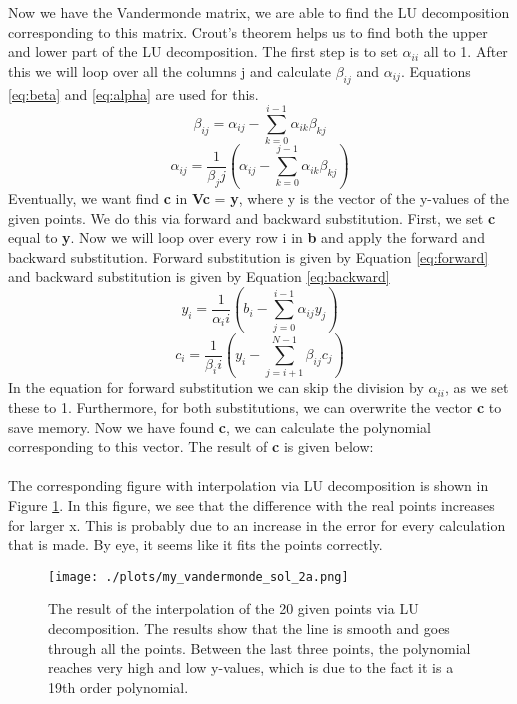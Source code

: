 Now we have the Vandermonde matrix, we are able to find the LU decomposition corresponding to this matrix. Crout's theorem helps us to find both the upper and lower part of the LU decomposition. The first step is to set $\alpha_{ii}$ all to 1. After this we will loop over all the columns j and calculate $\beta_{ij}$ and $\alpha_{ij}$. Equations \ref{eq:beta} and \ref{eq:alpha} are used for this.
\begin{equation}\label{eq:beta}
    \beta_{ij} = \alpha_{ij} - \sum^{i-1}_{k=0}{\alpha_{ik}\beta_{kj}}
\end{equation}
\begin{equation}\label{eq:alpha}
    \alpha_{ij} = \frac{1}{\beta_jj} \left(\alpha_{ij} - \sum^{j-1}_{k=0}{\alpha_{ik}\beta_{kj}}\right)
\end{equation}
Eventually, we want find \textbf{c} in \textbf{Vc} = \textbf{y}, where y is the vector of the y-values of the given points. We do this via forward and backward substitution. First, we set \textbf{c} equal to \textbf{y}. Now we will loop over every row i in \textbf{b} and apply the forward and backward substitution. Forward substitution is given by Equation \ref{eq:forward} and backward substitution is given by Equation \ref{eq:backward}
\begin{equation}\label{eq:forward}
    y_i = \frac{1}{\alpha_ii} \left(b_i - \sum^{i-1}_{j=0}{\alpha_{ij}y_{j}}\right)
\end{equation}
\begin{equation}\label{eq:backward}
    c_i = \frac{1}{\beta_ii} \left(y_i - \sum^{N-1}_{j=i+1}{\beta_{ij}c_{j}}\right)
\end{equation}
In the equation for forward substitution we can skip the division by $\alpha_{ii}$, as we set these to 1. Furthermore, for both substitutions, we can overwrite the vector \textbf{c} to save memory. Now we have found \textbf{c}, we can calculate the polynomial corresponding to this vector. The result of \textbf{c} is given below: 
\\

\\
The corresponding figure with interpolation via LU decomposition is shown in Figure \ref{fig:2a}. In this figure, we see that the difference with the real points increases for larger x. This is probably due to an increase in the error for every calculation that is made. By eye, it seems like it fits the points correctly. 

\begin{figure}[h!]
  \centering
  \texttt{[image: ./plots/my\_vandermonde\_sol\_2a.png]}
  \caption{The result of the interpolation of the 20 given points via LU decomposition. The results show that the line is smooth and goes through all the points. Between the last three points, the polynomial reaches very high and low y-values, which is due to the fact it is a 19th order polynomial.}
  \label{fig:2a}
\end{figure}

